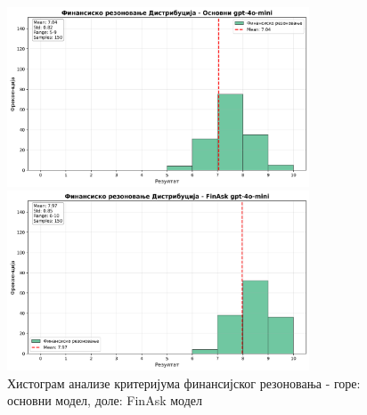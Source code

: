 \begin{figure}[h]
    \centering
    \includegraphics[width=0.8\textwidth]{images/osnovni/criteria_analysis_financial_reasoning_histogram.png}
    
    \vspace{0.5cm}
    
    \includegraphics[width=0.8\textwidth]{images/FinAsk/criteria_analysis_financial_reasoning_histogram.png}
    \caption{Хистограм анализе критеријума финансијског резоновања - горе: основни модел, доле: FinAsk модел}
    \label{fig:comparison_financial}
\end{figure}

